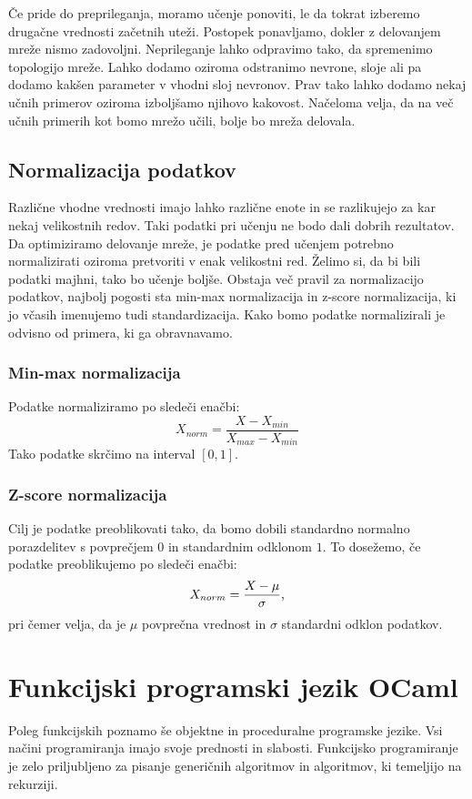 \documentclass[mat1]{fmfdelo}
\begin{document}
Če pride do preprileganja, moramo učenje ponoviti, le da tokrat izberemo drugačne vrednosti začetnih uteži. Postopek ponavljamo, dokler z delovanjem mreže nismo zadovoljni. Neprileganje lahko odpravimo tako, da spremenimo topologijo mreže. Lahko dodamo oziroma odstranimo nevrone, sloje ali pa dodamo kakšen parameter v vhodni sloj nevronov. Prav tako lahko dodamo nekaj učnih primerov oziroma izboljšamo njihovo kakovost. Načeloma velja, da na več učnih primerih kot bomo mrežo učili, bolje bo mreža delovala.
%
\subsection{Normalizacija podatkov}
Različne vhodne vrednosti imajo lahko različne enote in se razlikujejo za kar nekaj velikostnih redov. Taki podatki pri učenju ne bodo dali dobrih rezultatov. Da optimiziramo delovanje mreže, je podatke pred učenjem potrebno normalizirati oziroma pretvoriti v enak velikostni red. Želimo si, da bi bili podatki majhni, tako bo učenje boljše. Obstaja več pravil za normalizacijo podatkov, najbolj pogosti sta min-max normalizacija in z-score normalizacija, ki jo včasih imenujemo tudi standardizacija. Kako bomo podatke normalizirali je odvisno od primera, ki ga obravnavamo.
%
\subsubsection{Min-max normalizacija}
Podatke normaliziramo po sledeči enačbi:
%
\begin{equation}
X_{norm} = \frac{X -X_{min}}{X_{max}-X_{min}}
\end{equation}
%
Tako podatke skrčimo na interval $[0,1]$. 
%
\subsubsection{Z-score normalizacija}
Cilj je podatke preoblikovati tako, da bomo dobili standardno normalno porazdelitev s povprečjem $0$ in standardnim odklonom $1$. To dosežemo, če podatke preoblikujemo po sledeči enačbi:
%
\begin{equation}
X_{norm} = \frac{X - \mu}{\sigma} \text,
\end{equation}
%
pri čemer velja, da je $\mu$  povprečna vrednost in $\sigma$ standardni odklon podatkov.
%
\section{Funkcijski programski jezik OCaml}
Poleg funkcijskih poznamo še objektne in proceduralne programske jezike. Vsi načini programiranja imajo svoje prednosti in slabosti. Funkcijsko programiranje je zelo priljubljeno za pisanje generičnih algoritmov in algoritmov, ki temeljijo na rekurziji. 
\end{document}
